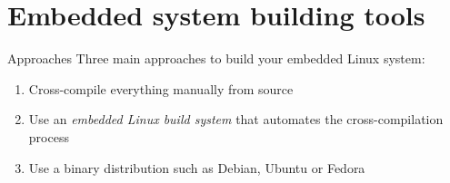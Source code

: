 \section{Embedded system building tools}

\begin{frame}{Approaches}
  Three main approaches to build your embedded Linux system:
  \begin{enumerate}
  \item Cross-compile everything manually from source
  \item Use an {\em embedded Linux build system} that automates the
    cross-compilation process
  \item Use a binary distribution such as Debian, Ubuntu or Fedora
  \end{enumerate}
\end{frame}

